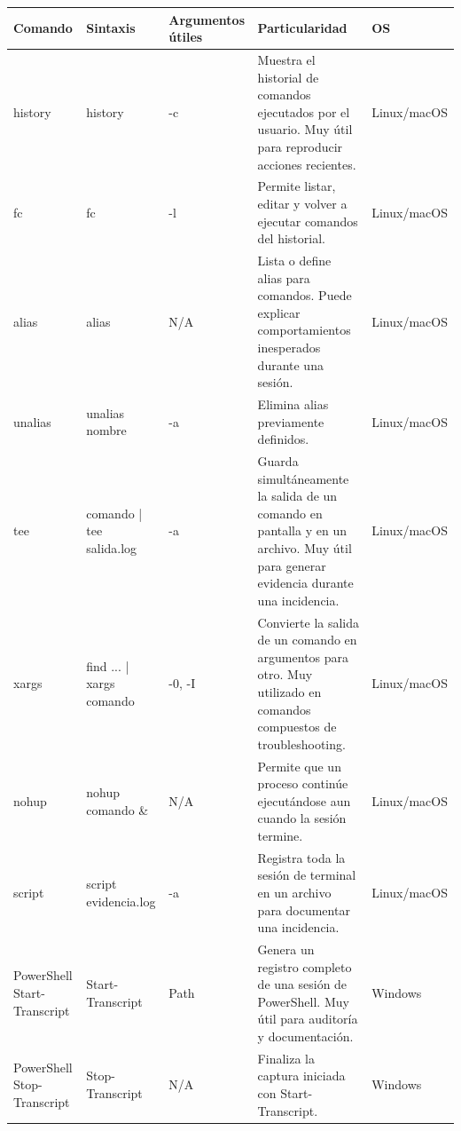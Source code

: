 \documentclass[a4paper,10pt]{article}
\begin{document}
\begin{longtable}{|p{2.8cm}|p{3.3cm}|p{4cm}|p{5.3cm}|p{1.5cm}|}

\hline
Comando &
Sintaxis &
Argumentos útiles &
Particularidad &
OS
\\
\hline
\endhead

history &
history &
-c &
Muestra el historial de comandos ejecutados por el usuario. Muy útil para reproducir acciones recientes. &
Linux/macOS
\\
\hline

fc &
fc &
-l &
Permite listar, editar y volver a ejecutar comandos del historial. &
Linux/macOS
\\
\hline

alias &
alias &
N/A &
Lista o define alias para comandos. Puede explicar comportamientos inesperados durante una sesión. &
Linux/macOS
\\
\hline

unalias &
unalias nombre &
-a &
Elimina alias previamente definidos. &
Linux/macOS
\\
\hline

tee &
comando | tee salida.log &
-a &
Guarda simultáneamente la salida de un comando en pantalla y en un archivo. Muy útil para generar evidencia durante una incidencia. &
Linux/macOS
\\
\hline

xargs &
find ... | xargs comando &
-0, -I &
Convierte la salida de un comando en argumentos para otro. Muy utilizado en comandos compuestos de troubleshooting. &
Linux/macOS
\\
\hline

nohup &
nohup comando \& &
N/A &
Permite que un proceso continúe ejecutándose aun cuando la sesión termine. &
Linux/macOS
\\
\hline

script &
script evidencia.log &
-a &
Registra toda la sesión de terminal en un archivo para documentar una incidencia. &
Linux/macOS
\\
\hline

PowerShell Start-Transcript &
Start-Transcript &
Path &
Genera un registro completo de una sesión de PowerShell. Muy útil para auditoría y documentación. &
Windows
\\
\hline

PowerShell Stop-Transcript &
Stop-Transcript &
N/A &
Finaliza la captura iniciada con Start-Transcript. &
Windows
\\
\hline

\end{longtable}
\end{document}
